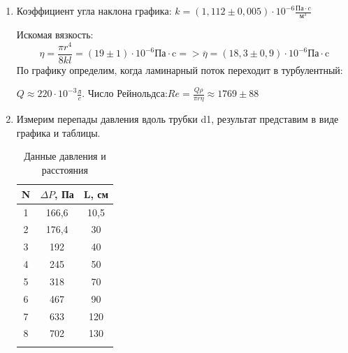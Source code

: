 \documentclass[a4paper, 12pt]{article}%
\begin{document}
\begin{enumerate}
	
	\begin{figure}[H]
		\caption{}
	\end{figure}




\item Коэффициент угла наклона графика: $k = (1,112 \pm 0,005)\cdot 10^{-6} \frac{\text{Па} \cdot c}{\text{м}^3}$

Искомая вязкость:
\[
\eta = \frac{\pi r^4 }{8 k l} = (19 \pm 1) \cdot 10^{-6} \text{Па} \cdot \text{c} => \overline \eta = (18,3\pm 0,9)\cdot 10^{-6}  \text{Па} \cdot \text{c}
\]
По графику определим, когда ламинарный поток переходит в турбулентный:

$Q \approx 220 \cdot 10^{-3} \frac{\text{л}}{c} $.
Число Рейнольдса:$Re = \frac{Q \rho}{\pi r \eta} \approx 1769 \pm 88$ 
\newpage

\item Измерим перепады давления вдоль трубки d1, результат представим в виде графика и таблицы.


	\begin{longtable}{|c|c|c|}
		\hline 
		N & $\Delta P$, Па& L, см \\
		\hline
		1 & 166,6 & 10,5\\
		\hline
		2 & 176,4 & 30\\
		\hline
		3 & 192 & 40\\
		\hline
		4 & 245 & 50\\
		\hline
		5 & 318 & 70\\
		\hline
		6 & 467 & 90\\
		\hline
		7 & 633 & 120\\
		\hline
		8 & 702 & 130\\
		\hline
		\caption{Данные давления и расстояния}
	\end{longtable}
	

\end{enumerate}
\end{document}

